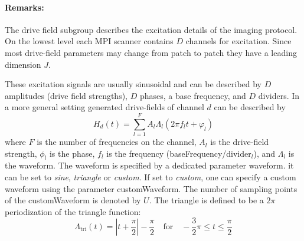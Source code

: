 \documentclass[landscape,a4paper]{article} %
\newcommand{\inlvar}[1]{{\ttfamily#1}}
\begin{document}
\begin{multicols}{2}
\paragraph{Remarks:} The drive field subgroup describes the excitation details of the imaging protocol. On the lowest level each MPI scanner contains $D$ channels for excitation. Since most drive-field parameters may change from patch to patch they have a leading dimension $J$.

These excitation signals are usually sinusoidal and can be described by $D$ amplitudes (drive field strengths), $D$ phases, a base frequency, and $D$ dividers. In a more general setting generated drive-fields of channel $d$ can be described by
$$
H_d(t) = \sum_{l=1}^{F} A_l \Lambda_l (2\pi f_l t + \varphi_l)
$$
where $F$ is the number of frequencies on the channel, $A_l$ is the drive-field strength, $\phi_l$ is the phase, $f_l$ is the frequency (\inlvar{baseFrequency}/\inlvar{divider}$_l$), and $\Lambda_l$ is the waveform. The waveform is specified by a dedicated parameter \inlvar{waveform}. it can be set to \textit{sine}, \textit{triangle} or \textit{custom}. If set to \textit{custom}, one can specify a custom waveform using the parameter \inlvar{customWaveform}. The number of sampling points of the \inlvar{customWaveform} is denoted by $U$. The triangle is defined to be a $2\pi$ periodization of the
triangle function:
$$
 \Lambda_\text{tri}(t) = \left\vert t+\frac{\pi}{2}\right\vert - \frac{\pi}{2} \quad \text{for} \quad -\frac{3}{2}\pi\leq t \leq \frac{\pi}{2}
$$
\end{multicols}
\end{document}

